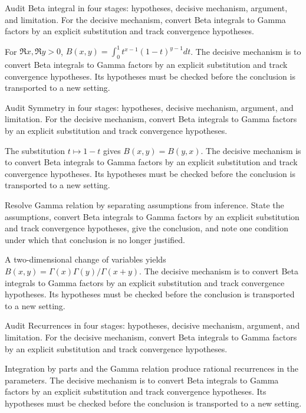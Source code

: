 \begin{problem}\label{prob:iv20-problem-01}
Audit Beta integral in four stages: hypotheses, decisive mechanism, argument, and limitation. For the decisive mechanism, convert Beta integrals to Gamma factors by an explicit substitution and track convergence hypotheses.
\end{problem}
\begin{solution}
For $\Re x,\Re y>0$, $B(x,y)=\int_0^1 t^{x-1}(1-t)^{y-1}dt$. The decisive mechanism is to convert Beta integrals to Gamma factors by an explicit substitution and track convergence hypotheses. Its hypotheses must be checked before the conclusion is transported to a new setting.
\end{solution}

\begin{problem}\label{prob:iv20-problem-02}
Audit Symmetry in four stages: hypotheses, decisive mechanism, argument, and limitation. For the decisive mechanism, convert Beta integrals to Gamma factors by an explicit substitution and track convergence hypotheses.
\end{problem}
\begin{solution}
The substitution $t\mapsto1-t$ gives $B(x,y)=B(y,x)$. The decisive mechanism is to convert Beta integrals to Gamma factors by an explicit substitution and track convergence hypotheses. Its hypotheses must be checked before the conclusion is transported to a new setting.
\end{solution}

\begin{problem}\label{prob:iv20-problem-03}
Resolve Gamma relation by separating assumptions from inference. State the assumptions, convert Beta integrals to Gamma factors by an explicit substitution and track convergence hypotheses, give the conclusion, and note one condition under which that conclusion is no longer justified.
\end{problem}
\begin{solution}
A two-dimensional change of variables yields $B(x,y)=\Gamma(x)\Gamma(y)/\Gamma(x+y)$. The decisive mechanism is to convert Beta integrals to Gamma factors by an explicit substitution and track convergence hypotheses. Its hypotheses must be checked before the conclusion is transported to a new setting.
\end{solution}

\begin{problem}\label{prob:iv20-problem-04}
Audit Recurrences in four stages: hypotheses, decisive mechanism, argument, and limitation. For the decisive mechanism, convert Beta integrals to Gamma factors by an explicit substitution and track convergence hypotheses.
\end{problem}
\begin{solution}
Integration by parts and the Gamma relation produce rational recurrences in the parameters. The decisive mechanism is to convert Beta integrals to Gamma factors by an explicit substitution and track convergence hypotheses. Its hypotheses must be checked before the conclusion is transported to a new setting.
\end{solution}

